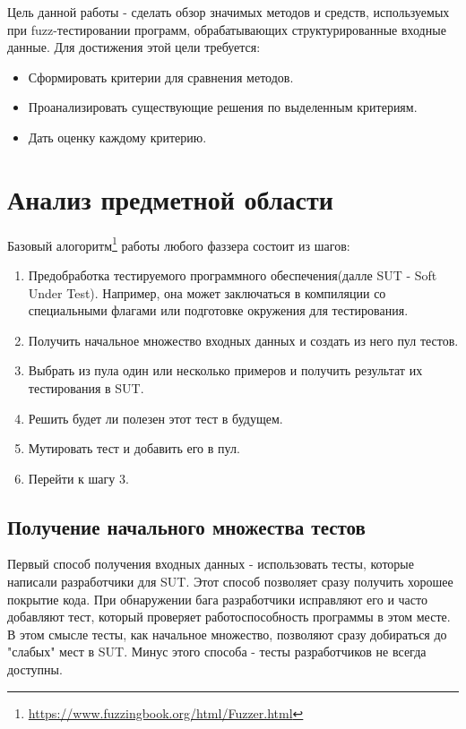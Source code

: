 \documentclass[a4paper]{article}
\begin{document}
Цель данной работы - сделать обзор значимых методов и средств, используемых при fuzz-тестировании программ, обрабатывающих структурированные входные данные. Для достижения этой цели требуется:

\begin{itemize}
\item Сформировать критерии для сравнения методов.
\item Проанализировать существующие решения по выделенным критериям.
\item Дать оценку каждому критерию.
\end{itemize}

\newpage
\section{Анализ предметной области}
\indent
 
Базовый алогоритм\footnote[1]{\href{https://www.fuzzingbook.org/html/Fuzzer.html}{https://www.fuzzingbook.org/html/Fuzzer.html}} работы любого фаззера состоит из шагов:

\begin{enumerate}
    \item Предобработка тестируемого программного обеспечения(далле SUT - Soft Under Test). Например, она может заключаться в компиляции со специальными флагами или подготовке окружения для тестирования. 
    \item Получить начальное множество входных данных и создать из него пул тестов.
    \item Выбрать из пула один или несколько примеров и получить результат их тестирования в SUT.
    \item Решить будет ли полезен этот тест в будущем.
    \item Мутировать тест и добавить его в пул.
    \item Перейти к шагу 3.
\end{enumerate}

\subsection{Получение начального множества тестов}
\indent

Первый способ получения входных данных - использовать тесты, которые написали разработчики для SUT. Этот способ позволяет сразу получить хорошее покрытие кода. При обнаружении бага разработчики исправляют его и часто добавляют тест, который проверяет работоспособность программы в этом месте. В этом смысле тесты, как начальное множество, позволяют сразу добираться до "слабых" мест в SUT. Минус этого способа - тесты разработчиков не всегда доступны.
\indent
\end{document}
